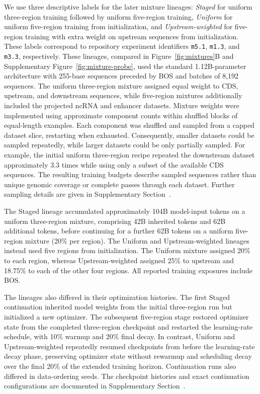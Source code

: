 \documentclass[a4paper,num-refs]{oup-contemporary}
\begin{document}
We use three descriptive labels for the later mixture lineages:
\emph{Staged} for uniform three-region training followed by uniform
five-region training, \emph{Uniform} for uniform five-region training
from initialization, and \emph{Upstream-weighted} for five-region training
with extra weight on upstream sequences from initialization.
These labels correspond to repository experiment identifiers
\texttt{m5.1}, \texttt{m1.3}, and \texttt{m3.3}, respectively.
These lineages, compared in Figure~\ref{fig:mixtures}B and Supplementary
Figure~\ref{fig:mixture-probe}, used the standard
1.12B-parameter architecture with 255-base sequences preceded by BOS
and batches of 8,192 sequences.
The uniform three-region mixture assigned equal weight to CDS, upstream,
and downstream sequences, while five-region mixtures additionally
included the projected ncRNA and enhancer datasets.
Mixture weights were implemented using approximate component counts
within shuffled blocks of equal-length examples. Each component was
shuffled and sampled from a capped dataset slice, restarting when
exhausted. Consequently, smaller datasets could be sampled repeatedly,
while larger datasets could be only partially sampled. For example,
the initial uniform three-region recipe repeated the downstream dataset
approximately 3.3 times while using only a subset of the available CDS
sequences. The resulting training budgets describe sampled sequences
rather than unique genomic coverage or complete passes through each
dataset. Further sampling details are given in Supplementary
Section~.

The Staged lineage accumulated
approximately 104B model-input tokens on a uniform three-region mixture,
comprising 42B inherited tokens and 62B additional tokens, before
continuing for a further 62B tokens on a uniform five-region mixture
(20\% per region). The Uniform and Upstream-weighted lineages instead used five regions
from initialization. The Uniform mixture assigned 20\% to each region,
whereas Upstream-weighted assigned 25\% to upstream and 18.75\% to each of the
other four regions. All reported training exposures include BOS.

The lineages also differed in their optimization histories.
The first Staged continuation inherited model weights from the initial
three-region run but initialized a new optimizer. The subsequent
five-region stage restored optimizer state from the completed
three-region checkpoint and restarted the learning-rate schedule,
with 10\% warmup and 20\% final decay.
In contrast, Uniform and Upstream-weighted repeatedly resumed checkpoints from
before the learning-rate decay phase, preserving optimizer state
without rewarmup and scheduling decay over the final 20\% of the
extended training horizon. Continuation runs also differed in
data-ordering seeds. The checkpoint histories and exact continuation
configurations are documented in Supplementary
Section~.
\end{document}

